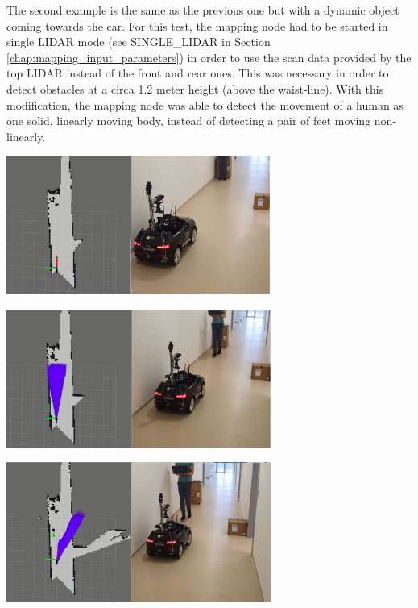 The second example is the same as the previous one but with a dynamic object coming towards the car. For this test, the mapping node had to be started in single LIDAR mode (see SINGLE\_LIDAR in Section \ref{chap:mapping_input_parameters}) in order to use the scan data provided by the top LIDAR instead of the front and rear ones. This was necessary in order to detect obstacles at a circa 1.2 meter height (above the waist-line). With this modification, the mapping node was able to detect the movement of a human as one solid, linearly moving body, instead of detecting a pair of feet moving non-linearly. 

\begin{center}
    \includegraphics[width=0.65\textwidth]{figures/raw/local_planner_real_test_joined_straight_traj_1_dynamic_obj_1.png}
    
    \vspace{0.5cm}
    \includegraphics[width=0.65\textwidth]{figures/raw/local_planner_real_test_joined_straight_traj_1_dynamic_obj_2.png}
    
    \vspace{0.5cm}
    \includegraphics[width=0.65\textwidth]{figures/raw/local_planner_real_test_joined_straight_traj_1_dynamic_obj_3.png}
    

\end{center}
